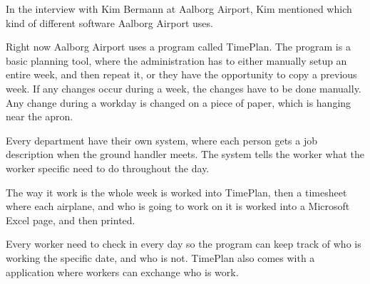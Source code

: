 In the interview with Kim Bermann at Aalborg Airport, Kim mentioned which kind of different software Aalborg Airport uses.

Right now Aalborg Airport uses a program called TimePlan.
The program is a basic planning tool, where the administration has to either manually setup an entire week, and then repeat it, or they have the opportunity to copy a previous week.
If any changes occur during a week, the changes have to be done manually. Any change during a workday is changed on a piece of paper, which is hanging near the apron.

Every department have their own system, where each person gets a job description when the ground handler meets. The system tells the worker what the worker specific need to do throughout the day.

The way it work is the whole week is worked into TimePlan, then a timesheet where each airplane, and who is going to work on it is worked into a Microsoft Excel page, and then printed.


Every worker need to check in every day so the program can keep track of who is working the specific date, and who is not. TimePlan also comes with a application where workers can exchange who is work.




